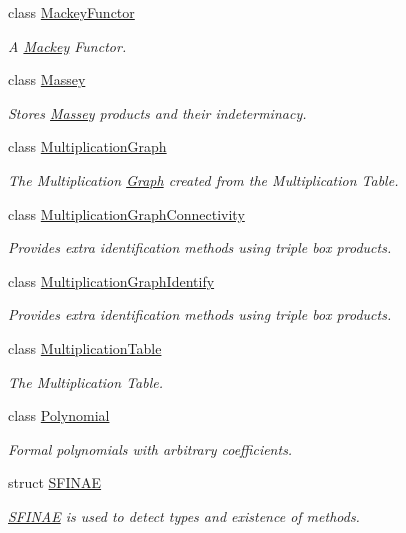 \begin{DoxyCompactItemize}
class \hyperlink{classMackey_1_1MackeyFunctor}{Mackey\+Functor}
\begin{DoxyCompactList}\small\item\em A \hyperlink{namespaceMackey}{Mackey} Functor. \end{DoxyCompactList}\item 
class \hyperlink{classMackey_1_1Massey}{Massey}
\begin{DoxyCompactList}\small\item\em Stores \hyperlink{classMackey_1_1Massey}{Massey} products and their indeterminacy. \end{DoxyCompactList}\item 
class \hyperlink{classMackey_1_1MultiplicationGraph}{Multiplication\+Graph}
\begin{DoxyCompactList}\small\item\em The Multiplication \hyperlink{classMackey_1_1Graph}{Graph} created from the Multiplication Table. \end{DoxyCompactList}\item 
class \hyperlink{classMackey_1_1MultiplicationGraphConnectivity}{Multiplication\+Graph\+Connectivity}
\begin{DoxyCompactList}\small\item\em Provides extra identification methods using triple box products. \end{DoxyCompactList}\item 
class \hyperlink{classMackey_1_1MultiplicationGraphIdentify}{Multiplication\+Graph\+Identify}
\begin{DoxyCompactList}\small\item\em Provides extra identification methods using triple box products. \end{DoxyCompactList}\item 
class \hyperlink{classMackey_1_1MultiplicationTable}{Multiplication\+Table}
\begin{DoxyCompactList}\small\item\em The Multiplication Table. \end{DoxyCompactList}\item 
class \hyperlink{classMackey_1_1Polynomial}{Polynomial}
\begin{DoxyCompactList}\small\item\em Formal polynomials with arbitrary coefficients. \end{DoxyCompactList}\item 
struct \hyperlink{structMackey_1_1SFINAE}{S\+F\+I\+N\+AE}
\begin{DoxyCompactList}\small\item\em \hyperlink{structMackey_1_1SFINAE}{S\+F\+I\+N\+AE} is used to detect types and existence of methods. \end{DoxyCompactList}\item 

\end{DoxyCompactItemize}
